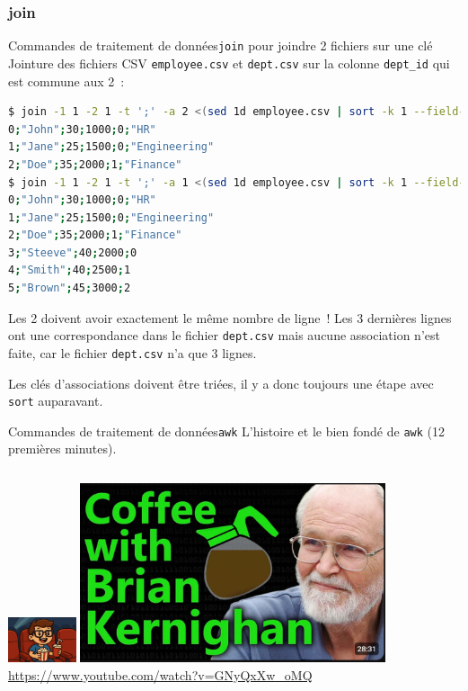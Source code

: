 \documentclass{beamer}
\begin{document}
    \subsubsection{join}\label{subsubsec:join}
    \begin{frame}[fragile]{Commandes de traitement de données}{\lstinline{join} pour joindre 2 fichiers sur une clé}
        Jointure des fichiers CSV \lstinline{employee.csv} et \lstinline{dept.csv} sur la colonne \lstinline{dept_id} qui est commune aux 2~:
        \begin{lstlisting}[language=bash,basicstyle=\tiny\ttfamily]
$ join -1 1 -2 1 -t ';' -a 2 <(sed 1d employee.csv | sort -k 1 --field-separator=';') <(sed 1d dept.csv | sort -k 1 --field-separator=';')
0;"John";30;1000;0;"HR"
1;"Jane";25;1500;0;"Engineering"
2;"Doe";35;2000;1;"Finance"
$ join -1 1 -2 1 -t ';' -a 1 <(sed 1d employee.csv | sort -k 1 --field-separator=';') <(sed 1d dept.csv | sort -k 1 --field-separator=';')
0;"John";30;1000;0;"HR"
1;"Jane";25;1500;0;"Engineering"
2;"Doe";35;2000;1;"Finance"
3;"Steeve";40;2000;0
4;"Smith";40;2500;1
5;"Brown";45;3000;2
        \end{lstlisting}
        \begin{dangercolorbox}
            Les 2 doivent avoir exactement le même nombre de ligne~!
            Les 3 dernières lignes ont une correspondance dans le fichier \lstinline{dept.csv} mais aucune association n'est faite, car le fichier \lstinline{dept.csv} n'a que 3 lignes.

            Les clés d'associations doivent être triées, il y a donc toujours une étape avec \lstinline{sort} auparavant.
        \end{dangercolorbox}
    \end{frame}

    \begin{frame}{Commandes de traitement de données}{\lstinline{awk}}
        L'histoire et le bien fondé de \lstinline{awk} (12 premières minutes).
        \bigbreak
        \begin{columns}
            \centering
            \includegraphics[width=2cm]{image/seat-and-watch}
            \includegraphics[width=9cm]{image/coffee-with-bk} \\ \url{https://www.youtube.com/watch?v=GNyQxXw_oMQ} \\
        \end{columns}
    \end{frame}
\end{document}
